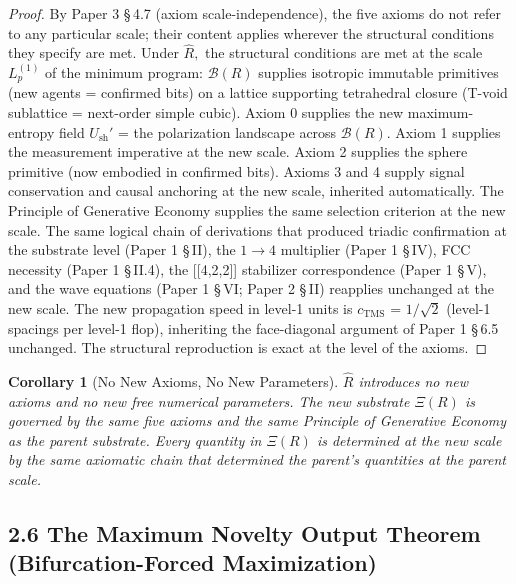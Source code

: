 \documentclass[11pt,oneside]{report}
\newtheorem{corollary}[theorem]{Corollary}
\theoremstyle{definition}
\theoremstyle{remark}
\begin{document}
\begin{proof}
By Paper 3 \S\,4.7 (axiom scale-independence), the five
axioms do not refer to any particular scale; their content applies
wherever the structural conditions they specify are met. Under \ensuremath{\hat{R},} the
structural conditions are met at the scale \ensuremath{L_{p}^{(1)}} of the minimum
program: \ensuremath{\mathcal{B}(R)} supplies isotropic immutable primitives (new agents =
confirmed bits) on a lattice supporting tetrahedral closure (T-void
sublattice = next-order simple cubic). Axiom 0 supplies the new
maximum-entropy field \ensuremath{U_{\mathrm{sh}}'} = the polarization landscape across \ensuremath{\mathcal{B}(R).}
Axiom 1 supplies the measurement imperative at the new scale. Axiom 2
supplies the sphere primitive (now embodied in confirmed bits). Axioms 3
and 4 supply signal conservation and causal anchoring at the new scale,
inherited automatically. The Principle of Generative Economy supplies
the same selection criterion at the new scale. The same logical chain of
derivations that produced triadic confirmation at the substrate level
(Paper 1 \S\,II), the \ensuremath{1\to 4} multiplier (Paper 1 \S\,IV), FCC necessity (Paper 1
\S\,II.4), the [[4,2,2]] stabilizer correspondence (Paper 1 \S\,V),
and the wave equations (Paper 1 \S\,VI; Paper 2 \S\,II) reapplies unchanged at
the new scale. The new propagation speed in level-1 units is \ensuremath{c_{\mathrm{TMS}}} = \ensuremath{1/\sqrt{2}}
(level-1 spacings per level-1 flop), inheriting the face-diagonal
argument of Paper 1 \S\,6.5 unchanged. The structural reproduction is exact
at the level of the axioms.

\end{proof}

\begin{corollary}[No New Axioms, No New Parameters]
\ensuremath{\hat{R}} introduces no
new axioms and no new free numerical parameters. The new substrate \ensuremath{\Xi (R)}
is governed by the same five axioms and the same Principle of Generative
Economy as the parent substrate. Every quantity in \ensuremath{\Xi (R)} is determined at
the new scale by the same axiomatic chain that determined the parent's
quantities at the parent scale.
\end{corollary}

\subsection*{2.6 The Maximum Novelty Output Theorem (Bifurcation-Forced Maximization)}
\end{document}
